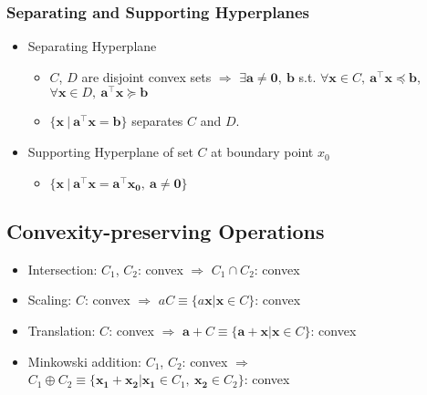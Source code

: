 \subsubsection*{Separating and Supporting Hyperplanes}
\begin{itemize}
    \item Separating Hyperplane
    \begin{itemize}
        \item $C$, $D$ are disjoint convex sets $\Rightarrow$
            $\exists \mathbf{a} \neq \mathbf{0},~\mathbf{b}$ s.t.
            $\forall \mathbf{x} \in C,~\mathbf{a}^{\top}\mathbf{x} \preceq \mathbf{b}$,
            $\forall \mathbf{x} \in D,~\mathbf{a}^{\top}\mathbf{x} \succeq \mathbf{b}$
        \item $\{\mathbf{x}~|~\mathbf{a}^{\top}\mathbf{x} = \mathbf{b}\}$ separates $C$ and $D$.
    \end{itemize}
    \item Supporting Hyperplane of set $C$ at boundary point $x_0$
    \begin{itemize}
        \item $\{\mathbf{x}~|~\mathbf{a}^{\top}\mathbf{x} = \mathbf{a}^{\top}\mathbf{x_0},~\mathbf{a}\neq\mathbf{0}\}$
    \end{itemize}
\end{itemize}

\subsection{Convexity-preserving Operations}
\begin{itemize}
    \item Intersection: $C_1$, $C_2$: convex $\Rightarrow$ $C_1 \cap C_2$: convex
    \item Scaling: $C$: convex $\Rightarrow$ $aC \equiv \{a\mathbf{x}|\mathbf{x} \in C\}$: convex
    \item Translation: $C$: convex $\Rightarrow$ $\mathbf{a} + C \equiv \{\mathbf{a}+\mathbf{x}|\mathbf{x}\in C\}$: convex
    \item Minkowski addition: $C_1$, $C_2$: convex $\Rightarrow$ $C_1 \oplus C_2 \equiv \{\mathbf{x_1}+\mathbf{x_2}|\mathbf{x_1}\in C_1,~\mathbf{x_2}\in C_2\}$: convex
\end{itemize}
